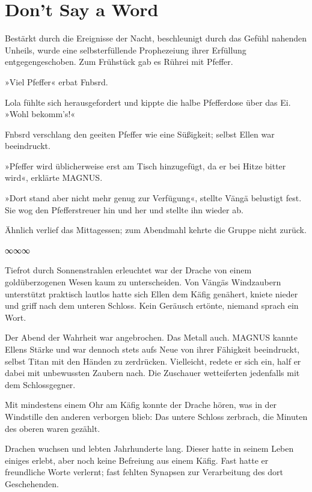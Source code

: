 \chapter{Don’t Say a Word}

Bestärkt durch die Ereignisse der Nacht, beschleunigt durch das Gefühl nahenden Unheils, wurde eine selbsterfüllende Prophezeiung ihrer Erfüllung entgegengeschoben. Zum Frühstück gab es Rührei mit Pfeffer.

»Viel Pfeffer« erbat Fnbsrd.

Lola fühlte sich herausgefordert und kippte die halbe Pfefferdose über das Ei. »Wohl bekomm’s!«

 Fnbsrd verschlang den geeiten Pfeffer wie eine Süßigkeit; selbst Ellen war beeindruckt.

»Pfeffer wird üblicherweise erst am Tisch hinzugefügt, da er bei Hitze bitter wird«, erklärte MAGNUS.

»Dort stand aber nicht mehr genug zur Verfügung«, stellte Vängä belustigt fest. Sie wog den Pfefferstreuer hin und her und stellte ihn wieder ab.

Ähnlich verlief das Mittagessen; zum Abendmahl kehrte die Gruppe nicht zurück.

\begin{center}
∞∞∞
\end{center}

Tiefrot durch Sonnenstrahlen erleuchtet war der Drache von einem goldüberzogenen Wesen kaum zu unterscheiden. Von Vängäs Windzaubern unterstützt praktisch lautlos hatte sich Ellen dem Käfig genähert, kniete nieder und griff nach dem unteren Schloss. Kein Geräusch ertönte, niemand sprach ein Wort.

Der Abend der Wahrheit war angebrochen. Das Metall auch. MAGNUS kannte Ellens Stärke und war dennoch stets aufs Neue von ihrer Fähigkeit beeindruckt, selbst Titan mit den Händen zu zerdrücken. Vielleicht, redete er sich ein, half er dabei mit unbewussten Zaubern nach. Die Zuschauer wetteiferten jedenfalls mit dem Schlossgegner.

Mit mindestens einem Ohr am Käfig konnte der Drache hören, was in der Windstille den anderen verborgen blieb: Das untere Schloss zerbrach, die Minuten des oberen waren gezählt.

Drachen wuchsen und lebten Jahrhunderte lang. Dieser hatte in seinem Leben einiges erlebt, aber noch keine Befreiung aus einem Käfig. Fast hatte er freundliche Worte verlernt; fast fehlten Synapsen zur Verarbeitung des dort Geschehenden.

